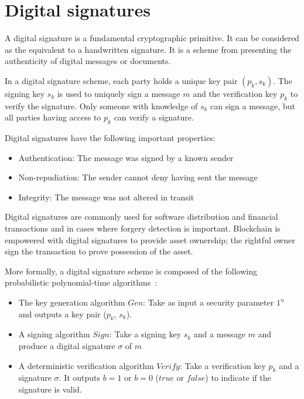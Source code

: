 \section{Digital signatures}
\label{preliminaries:sign}

A digital signature is a fundamental cryptographic primitive. It can be considered as the equivalent to a handwritten signature. It is a scheme from presenting the authenticity of digital messages or documents.

In a digital signature scheme, each party holds a unique key pair $(p_k, s_k)$. The signing key $s_k$ is used to uniquely sign a message $m$ and the verification key $p_k$ to verify the signature. Only someone with knowledge of $s_k$ can sign a message, but all parties having access to $p_k$ can verify a signature.

Digital signatures have the following important properties:

\begin{itemize}
  \item Authentication: The message was signed by a known sender
  \item Non-repudiation: The sender cannot deny having sent the message
  \item Integrity: The message was not altered in transit
\end{itemize}

Digital signatures are commonly used for software distribution and financial transactions and in cases where forgery detection is important. Blockchain is empowered with digital signatures to provide asset ownership; the rightful owner sign the transaction to prove possession of the asset.

More formally, a digital signature scheme is composed of the following probabilistic polynomial-time algorithms~\cite{Katz:2014:IMC:2700550,kiagias:crypto}:

\begin{itemize}
  \item The key generation algorithm $Gen$: Take as input a security parameter $1^{n}$ and outputs a key pair ($p_k$, $s_k$).
  \item A signing algorithm $Sign$: Take a signing key $s_k$ and a message $m$ and produce a digital signature $\sigma$ of $m$
  \item A deterministic verification algorithm $Verify$: Take a verification key $p_k$ and a signature $\sigma$. It outputs $b=1$ or $b=0$ ($true$ or $false$) to indicate if the signature is valid.
\end{itemize}

